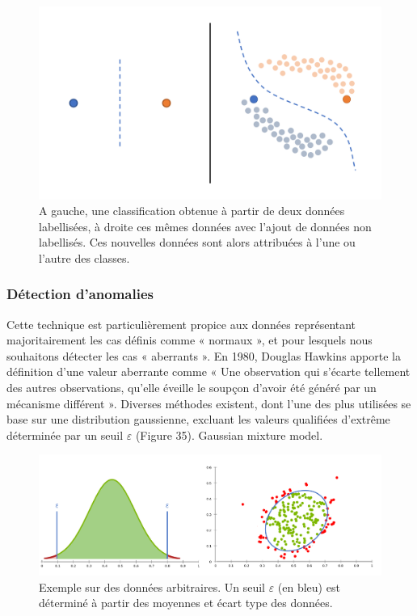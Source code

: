 \begin{figure}[H]
    \centering
    \includegraphics[width=\linewidth]{contents/chapter_3/resources/semi_supervised.pdf}
    \caption{A gauche, une classification obtenue à partir de deux données labellisées, à droite ces mêmes données avec l’ajout de données non labellisés. Ces nouvelles données sont alors attribuées à l’une ou l’autre des classes.}
    \label{fig:semi_supervised}
\end{figure}

\subsubsection{Détection d'anomalies}
Cette technique est particulièrement propice aux données représentant majoritairement les cas définis comme « normaux », et pour lesquels nous souhaitons détecter les cas « aberrants ». En 1980, Douglas Hawkins apporte la définition d’une valeur aberrante comme « Une observation qui s’écarte tellement des autres observations, qu’elle éveille le soupçon d’avoir été généré par un mécanisme différent ». Diverses méthodes existent, dont l’une des plus utilisées se base sur une distribution gaussienne, excluant les valeurs qualifiées d’extrême déterminée par un seuil $\varepsilon$ (Figure 35). Gaussian mixture model.
  
\begin{figure}[H]
    \centering
    \includegraphics[width=\linewidth]{contents/chapter_3/resources/anomaly_detection.png}
    \caption{Exemple sur des données arbitraires. Un seuil $\varepsilon$ (en bleu) est déterminé à partir des moyennes et écart type des données.}
    \label{fig:anomaly_detection}
\end{figure}

